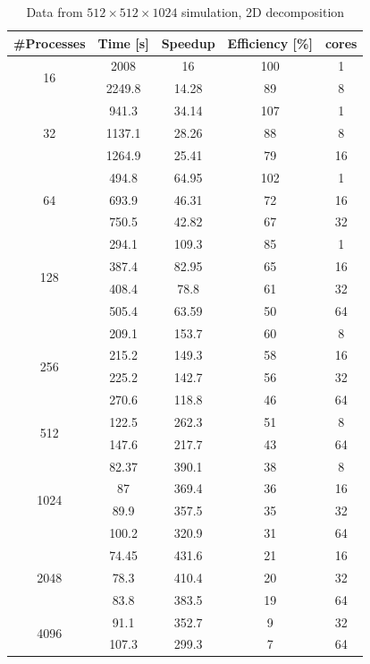 \begin{table}
\caption{Data from $512\times 512\times 1024$ simulation, 2D decomposition}
\begin{center}
\begin{tabular}{c c c c c}
\toprule
\textbf{\#Processes} & \textbf{Time [s]} & \textbf{Speedup} & \textbf{Efficiency [\%]} & \textbf{cores}\\
\midrule
\multirow{2}{*}{16} &  2008 & 16 & 100 & 1\\
& 2249.8 & 14.28 & 89 & 8\\
\hline
\multirow{3}{*}{32} & 941.3 & 34.14 & 107 &1\\
& 1137.1 & 28.26 & 88 & 8\\
& 1264.9 & 25.41 & 79 & 16\\
\hline
\multirow{3}{*}{64} & 494.8 & 64.95 & 102 & 1\\
& 693.9 & 46.31 & 72 & 16\\
& 750.5 & 42.82 & 67 & 32\\
\hline
\multirow{4}{*}{128} & 294.1 & 109.3 & 85  & 1\\
& 387.4 & 82.95 & 65 & 16\\
& 408.4 & 78.8 & 61 & 32\\
& 505.4 & 63.59 & 50 & 64\\
\hline
\multirow{4}{*}{256} & 209.1 & 153.7 & 60 & 8\\
& 215.2 & 149.3 & 58 & 16\\
& 225.2 & 142.7 & 56 & 32\\
& 270.6 & 118.8 & 46 & 64\\
\hline
\multirow{2}{*}{512} & 122.5 & 262.3 & 51 & 8\\
& 147.6 & 217.7 & 43 & 64\\
\hline
\multirow{4}{*}{1024} & 82.37 & 390.1 & 38 & 8\\
& 87 & 369.4 & 36 & 16\\
& 89.9 & 357.5 & 35 & 32\\
& 100.2 & 320.9 & 31& 64\\
\hline
\multirow{3}{*}{2048} & 74.45 & 431.6 & 21 & 16\\
& 78.3 & 410.4 & 20 & 32\\
& 83.8 & 383.5 & 19 & 64\\
\hline
\multirow{2}{*}{4096} & 91.1 & 352.7 & 9 & 32\\
& 107.3 & 299.3 & 7 & 64\\
\bottomrule
\end{tabular}
\end{center}
\label{512data:multi}
\end{table}


